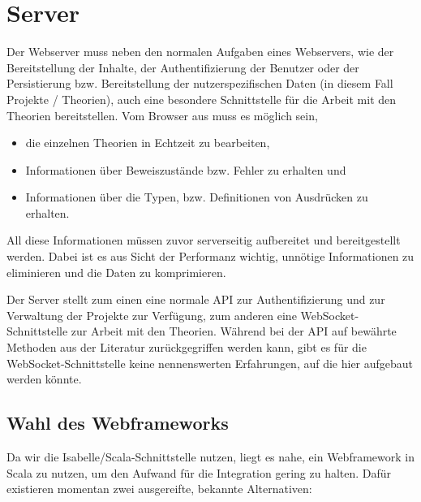 \section{Server}

Der Webserver muss neben den normalen Aufgaben eines Webservers, wie der Bereitstellung der Inhalte,
der Authentifizierung der Benutzer oder der Persistierung bzw. Bereitstellung der
nutzerspezifischen Daten (in diesem Fall Projekte / Theorien), auch eine besondere Schnittstelle
für die Arbeit mit den Theorien bereitstellen. Vom Browser aus muss es möglich sein,

\begin{itemize}
  \item die einzelnen Theorien in Echtzeit zu bearbeiten,
  \item Informationen über Beweiszustände bzw. Fehler zu erhalten und
  \item Informationen über die Typen, bzw. Definitionen von Ausdrücken zu erhalten.
\end{itemize}

All diese Informationen müssen zuvor serverseitig aufbereitet und bereitgestellt werden. Dabei ist
es aus Sicht der Performanz wichtig, unnötige Informationen zu eliminieren und die Daten zu
komprimieren.

Der Server stellt zum einen eine normale  API zur Authentifizierung und zur Verwaltung der
Projekte zur Verfügung, zum anderen eine WebSocket-Schnittstelle zur Arbeit mit den Theorien.
Während bei der  API auf bewährte Methoden aus der Literatur zurückgegriffen werden kann,
gibt es für die WebSocket-Schnittstelle keine nennenswerten Erfahrungen, auf die hier aufgebaut
werden könnte.

\subsection{Wahl des Webframeworks}

Da wir die Isabelle/Scala-Schnittstelle nutzen, liegt es nahe, ein Webframework in Scala zu nutzen,
um den Aufwand für die Integration gering zu halten. Dafür existieren momentan zwei ausgereifte,
bekannte Alternativen:

